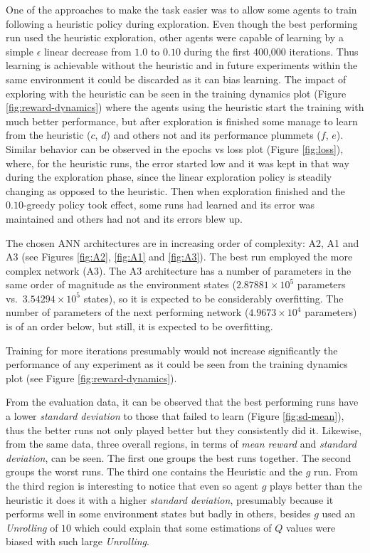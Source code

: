 \documentclass[
  12pt,
  openany]{book}
\begin{document}
One of the approaches to make the task easier was to allow some agents to train following a heuristic policy during exploration. Even though the best performing run used the heuristic exploration, other agents were capable of learning by a simple \(\epsilon\) linear decrease from \(1.0\) to \(0.10\) during the first 400,000 iterations. Thus learning is achievable without the heuristic and in future experiments within the same environment it could be discarded as it can bias learning. The impact of exploring with the heuristic can be seen in the training dynamics plot (Figure \ref{fig:reward-dynamics}) where the agents using the heuristic start the training with much better performance, but after exploration is finished some manage to learn from the heuristic (\(c\), \(d\)) and others not and its performance plummets (\(f\), \(e\)). Similar behavior can be observed in the epochs vs loss plot (Figure \ref{fig:loss}), where, for the heuristic runs, the error started low and it was kept in that way during the exploration phase, since the linear exploration policy is steadily changing as opposed to the heuristic. Then when exploration finished and the \(0.10\)-greedy policy took effect, some runs had learned and its error was maintained and others had not and its errors blew up.

The chosen ANN architectures are in increasing order of complexity: A2, A1 and A3 (see Figures \ref{fig:A2}, \ref{fig:A1} and \ref{fig:A3}). The best run employed the more complex network (A3). The A3 architecture has a number of parameters in the same order of magnitude as the environment states (\ensuremath{2.87881\times 10^{5}} parameters vs.~\ensuremath{3.54294\times 10^{5}} states), so it is expected to be considerably overfitting. The number of parameters of the next performing network (\ensuremath{4.9673\times 10^{4}} parameters) is of an order below, but still, it is expected to be overfitting.

Training for more iterations presumably would not increase significantly the performance of any experiment as it could be seen from the training dynamics plot (see Figure \ref{fig:reward-dynamics}).

From the evaluation data, it can be observed that the best performing runs have a lower \emph{standard deviation} to those that failed to learn (Figure \ref{fig:sd-mean}), thus the better runs not only played better but they consistently did it. Likewise, from the same data, three overall regions, in terms of \emph{mean reward} and \emph{standard deviation}, can be seen. The first one groups the best runs together. The second groups the worst runs. The third one contains the Heuristic and the \(g\) run. From the third region is interesting to notice that even so agent \(g\) plays better than the heuristic it does it with a higher \emph{standard deviation}, presumably because it performs well in some environment states but badly in others, besides \(g\) used an \emph{Unrolling} of \(10\) which could explain that some estimations of \(Q\) values were biased with such large \emph{Unrolling}.
\end{document}
